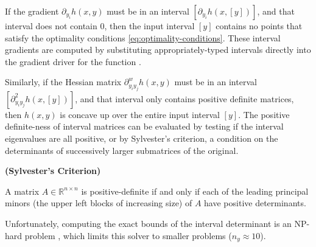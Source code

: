 \documentclass[twoside,leqno, twocolumn]{article}
\newcommand{\bbR}{\ensuremath{\mathbb{R}}}
\begin{document}
If the gradient $\partial_{y_i}h(x, y)$ must be in an interval $\left[\partial_{y_i}h(x, \left[y\right])\right]$, and that interval does not contain $0$, then the input interval $\left[y\right]$ contains no points that satisfy the optimality conditions \eqref{eq:optimality-conditions}. These interval gradients are computed by substituting appropriately-typed intervals directly into the gradient driver for the function \cite{griewankEvaluatingDerivativesPrinciples2008, rallGlobalOptimizationUsing1985}. 

Similarly, if the Hessian matrix $\partial^w_{y_iy_j}h(x,y)$ must be in an interval $\left[\partial^2_{y_iy_j}h(x, \left[y\right])\right]$, and that interval only contains positive definite matrices, then $h(x, y)$ is concave up over the entire input interval $\left[y\right]$. The positive definite-ness of interval matrices can be evaluated by testing if the interval eigenvalues are all positive, or by Sylvester's criterion, a condition on the determinants of successively larger submatrices of the original.
\begin{Definition}
	\label{def:sylvester}
	\textbf{(Sylvester's Criterion)}
	
	A matrix $A\in\bbR^{n\times n}$ is positive-definite if and only if each of the leading principal minors (the upper left blocks of increasing size) of $A$ have positive determinants.
\end{Definition}
Unfortunately, computing the exact bounds of the interval determinant is an NP-hard problem \cite{horacekDeterminantsIntervalMatrices2018}, which limits this solver to smaller problems ($n_y\approx10$). 
\end{document}
